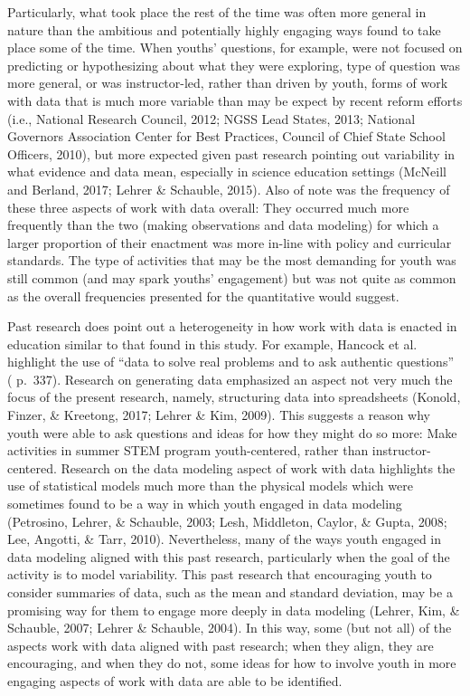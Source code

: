 \documentclass[]{msu-thesis}
\theoremstyle{definition}
\theoremstyle{definition}
\theoremstyle{definition}
\theoremstyle{remark}
\begin{document}
Particularly, what took place the rest of the time was often more
general in nature than the ambitious and potentially highly engaging
ways found to take place some of the time. When youths' questions, for
example, were not focused on predicting or hypothesizing about what they
were exploring, type of question was more general, or was
instructor-led, rather than driven by youth, forms of work with data
that is much more variable than may be expect by recent reform efforts
(i.e., National Research Council, 2012; NGSS Lead States, 2013; National
Governors Association Center for Best Practices, Council of Chief State
School Officers, 2010), but more expected given past research pointing
out variability in what evidence and data mean, especially in science
education settings (McNeill and Berland, 2017; Lehrer \& Schauble,
2015). Also of note was the frequency of these three aspects of work
with data overall: They occurred much more frequently than the two
(making observations and data modeling) for which a larger proportion of
their enactment was more in-line with policy and curricular standards.
The type of activities that may be the most demanding for youth was
still common (and may spark youths' engagement) but was not quite as
common as the overall frequencies presented for the quantitative would
suggest.

Past research does point out a heterogeneity in how work with data is
enacted in education similar to that found in this study. For example,
Hancock et al. highlight the use of ``data to solve real problems and to
ask authentic questions'' ( p.~337). Research on generating data
emphasized an aspect not very much the focus of the present research,
namely, structuring data into spreadsheets (Konold, Finzer, \& Kreetong,
2017; Lehrer \& Kim, 2009). This suggests a reason why youth were able
to ask questions and ideas for how they might do so more: Make
activities in summer STEM program youth-centered, rather than
instructor-centered. Research on the data modeling aspect of work with
data highlights the use of statistical models much more than the
physical models which were sometimes found to be a way in which youth
engaged in data modeling (Petrosino, Lehrer, \& Schauble, 2003; Lesh,
Middleton, Caylor, \& Gupta, 2008; Lee, Angotti, \& Tarr, 2010).
Nevertheless, many of the ways youth engaged in data modeling aligned
with this past research, particularly when the goal of the activity is
to model variability. This past research that encouraging youth to
consider summaries of data, such as the mean and standard deviation, may
be a promising way for them to engage more deeply in data modeling
(Lehrer, Kim, \& Schauble, 2007; Lehrer \& Schauble, 2004). In this way,
some (but not all) of the aspects work with data aligned with past
research; when they align, they are encouraging, and when they do not,
some ideas for how to involve youth in more engaging aspects of work
with data are able to be identified.
\end{document}
